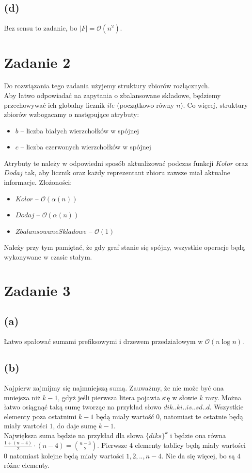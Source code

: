 \documentclass[12pt, a4paper]{article}
\newcommand{\MCALO}{\mathcal{O}}
\begin{document}
\subsection*{(d)}
Bez sensu to zadanie, bo $|F| = \MCALO(n^2)$.

\newpage\section*{Zadanie 2}
Do rozwiązania tego zadania użyjemy struktury zbiorów rozłącznych.\\ Aby łatwo
odpowiadać na zapytania o zbalansowane składowe, będziemy przechowywać ich
globalny licznik $ile$ (początkowo równy $n$). Co więcej, struktury zbiorów
wzbogacamy o następujące atrybuty:
\begin{itemize}
  \item $\mathit{b}$ -- liczba białych wierzchołków w spójnej
  \item $\mathit{c}$ -- liczba czerwonych wierzchołków w spójnej
\end{itemize}
Atrybuty te należy w odpowiedni sposób aktualizować podczas funkcji
$\mathit{Kolor}$ oraz $\mathit{Dodaj}$ tak, aby licznik oraz każdy reprezentant
zbioru zawsze miał aktualne informacje. Złożoności: 
\begin{itemize}
  \item $\mathit{Kolor}$ -- $\MCALO(\alpha(n))$
  \item $\mathit{Dodaj}$ -- $\MCALO(\alpha(n))$
  \item $\mathit{ZbalansowaneSkladowe}$ -- $\MCALO(1)$
\end{itemize}
Należy przy tym pamiętać, że gdy graf stanie się spójny, wszystkie operacje
będą wykonywane w czasie stałym.

\section*{Zadanie 3}
\subsection*{(a)}
Łatwo spałować sumami prefiksowymi i drzewem przedziałowym
w $\MCALO(n\log{n})$.

\subsection*{{(b)}}
Najpierw zajmijmy się najmniejszą sumą. Zauważmy, że nie może być ona mniejsza
niż $k-1$, gdyż jeśli pierwsza litera pojawia się w słowie $k$ razy. Można
łatwo osiągnąć taką sumę tworząc na przykład słowo $dik..ki..is..sd..d$.
Wszystkie elementy poza ostatnimi $k-1$ będą miały wartość $0$, natomiast te
ostatnie będą miały wartości $1$, do daje sumę $k-1$.\\ Największa suma będzie
na przykład dla słowa $\{diks\}^{k}$ i będzie ona równa $\frac{1 + (n-4)}{2}
\cdot (n-4) = \binom{n-3}{2}$. Pierwsze $4$ elementy tablicy będą miały
wartości $0$ natomiast kolejne będą miały wartości $1,2,..,n-4$. Nie da się więcej, bo
są $4$ różne elementy.
\end{document}
